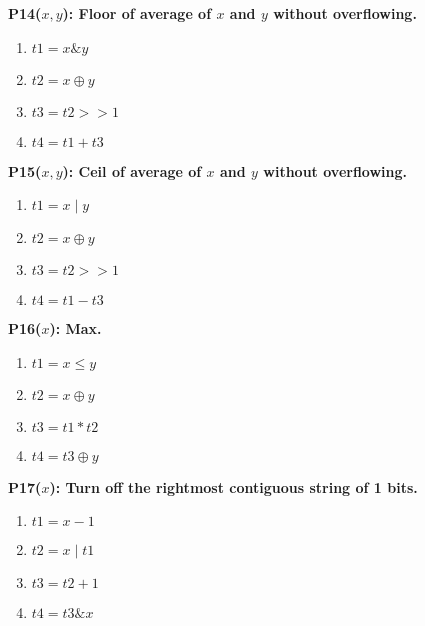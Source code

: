 \begin{figure}
\begin{multicols}{4}
   \begin{minipage}{.2\textwidth}
   \bf{P14}($x, y$): Floor of average of $x$ and $y$ without overflowing.
   \begin{enumerate}
    \item $t1 = x \& y$
    \item $t2 = x \oplus y$
    \item $t3 = t2 >> 1$
    \item $t4 = t1 + t3$
   \end{enumerate}
   \end{minipage}
   \vspace{12pt}
   
   \begin{minipage}{.2\textwidth}
   \bf{P15}($x, y$): Ceil of average of $x$ and $y$ without overflowing.
   \begin{enumerate}
    \item $t1 = x \mid y$
    \item $t2 = x \oplus y$
    \item $t3 = t2 >> 1$
    \item $t4 = t1 - t3$
   \end{enumerate}
   \end{minipage}
   \vspace{12pt}
   
   \begin{minipage}{.2\textwidth}
   \bf{P16}($x$): Max.
   \begin{enumerate}
    \item $t1 = x \leq y$
    \item $t2 = x \oplus y$
    \item $t3 = t1 * t2$
    \item $t4 = t3 \oplus y$
   \end{enumerate}
   \end{minipage}
   \vspace{12pt}
   
   \begin{minipage}{.2\textwidth}
   \bf{P17}($x$): Turn off the rightmost contiguous string of 1 bits.
   \begin{enumerate}
    \item $t1 = x - 1$
    \item $t2 = x \mid t1$
    \item $t3 = t2 + 1$
    \item $t4 = t3 \& x$
   \end{enumerate}
   \end{minipage}
   \vspace{12pt}
   

\end{multicols}
\end{figure}

